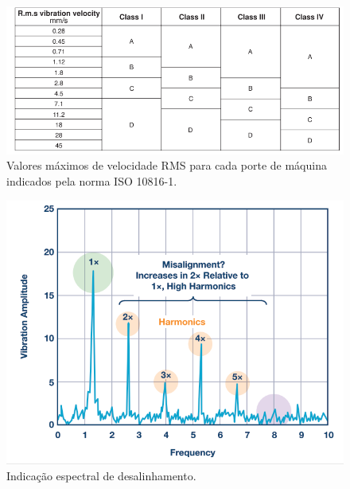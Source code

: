 \begin{figure}[H]
    \caption{Valores máximos de velocidade RMS para cada porte de máquina indicados pela norma ISO 10816-1.}
    \begin{center}
        \includegraphics[scale=.5]{referencial/img/iso10816-1_randall_p146.png}
    \end{center}
    \label{fig:}
\end{figure}

\begin{figure}[H]
    \caption{Indicação espectral de desalinhamento.}
    \begin{center}
        \includegraphics[scale=.4]{referencial/img/misa_analog_p2.png}
    \end{center}
    \label{fig:}
\end{figure}

